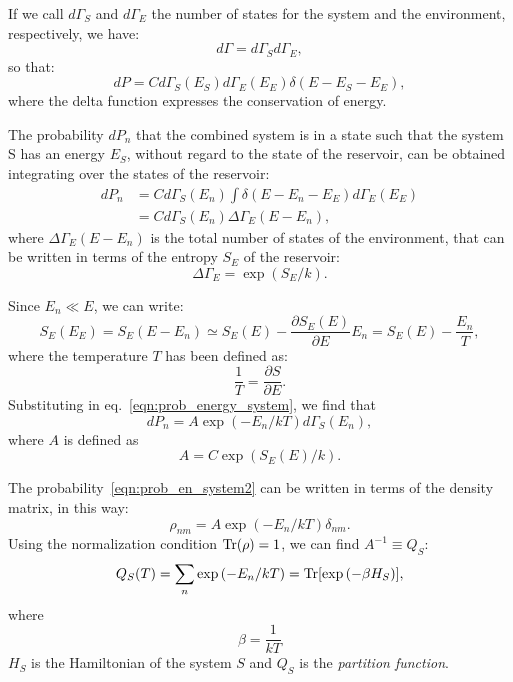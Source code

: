 If we call $d\Gamma_S$ and $d\Gamma_E$ the number of states for the system and the environment, respectively, we have:
\begin{equation}
        d\Gamma = d\Gamma_S d\Gamma_E, 
\end{equation}
so that:
\begin{equation}
    dP = C d\Gamma_S(E_S) d\Gamma_E(E_E) \delta(E-E_S-E_E),
\end{equation}
where the delta function expresses the conservation of energy.

The probability $dP_n$ that the combined system is in a state such that the system S has an energy $E_S$, without regard to the state of the reservoir, can be obtained integrating over the states of the reservoir:
\begin{equation}
\begin{split}
\label{eqn:prob_energy_system}
    dP_n &= Cd\Gamma_S(E_n) \int \delta(E-E_n-E_E) d\Gamma_E(E_E) \\
         &= Cd\Gamma_S(E_n) \Delta\Gamma_E(E-E_n),
\end{split}
\end{equation}
where $\Delta\Gamma_E(E-E_n)$ is the total number of states of the environment, that can be written in terms of the entropy $S_E$ of the reservoir:
\begin{equation*}
    \Delta\Gamma_E = \exp{(S_E/k)}.
\end{equation*}

Since $E_n \ll E$, we can write:
\begin{equation*}
    S_E(E_E) = S_E (E-E_n) \simeq S_E(E) - \frac{\partial S_E(E)}{\partial E} E_n = S_E(E) -\frac{E_n}{T},
\end{equation*}
where the temperature $T$ has been defined as:
\begin{equation*}
    \frac{1}{T} = \frac{\partial S}{\partial E}.
\end{equation*}
Substituting in eq.~\ref{eqn:prob_energy_system}, we find that
\begin{equation}
\label{eqn:prob_en_system2}
    dP_n = A \exp{(-E_n/kT)} d\Gamma_S(E_n),
\end{equation}
where $A$ is defined as
\begin{equation}
    A = C \exp{(S_E(E)/k)}.
\end{equation}

The probability~\ref{eqn:prob_en_system2} can be written in terms of the density matrix, in this way:
\begin{equation*}
    \rho_{nm} = A \exp{(-E_n/kT)} \delta_{nm}.
\end{equation*}
Using the normalization condition $\operatorname{Tr}(\rho) = 1$, we can find $A^{-1} \equiv Q_S$:
\begin{equation*}
    Q_S(T) = \sum_n \exp{(-E_n/kT)} = \operatorname{Tr}[\exp{(-\beta H_S)}],
\end{equation*}
where
\begin{equation*}
    \beta = \frac{1}{kT}
\end{equation*}
$H_S$ is the Hamiltonian of the system $S$ and $Q_S$ is the \emph{partition function}.

